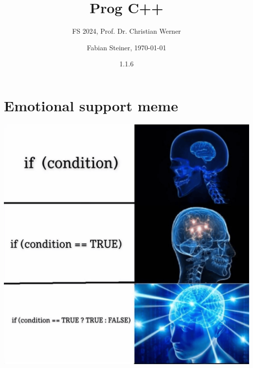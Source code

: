 \documentclass[fontsize=8pt, a4paper, fleqn, landscape, DIV=calc]{scrartcl}
\title{\vspace{-1cm}Prog C++}
\subtitle{FS 2024, Prof. Dr. Christian Werner}
\author{Fabian Steiner, \today}
\date{{\small 1.1.6}}
\begin{document}
	\begin{multicols*}{3}
        \raggedcolumns
        \begin{minipage}{0.75\columnwidth}
		      \maketitle
        \end{minipage}
        \begin{minipage}{0.2\columnwidth}
            \begin{center}
                \quad
                \qquad    
            \end{center}
        \end{minipage}
        
        \thispagestyle{fancy}%

        
        
        
        
        
        \section{Emotional support meme}
        
        \begin{center}
            \includegraphics[width=\columnwidth]{pictures/ifcondition.png}  
        \end{center}            

	\end{multicols*}
\end{document}
